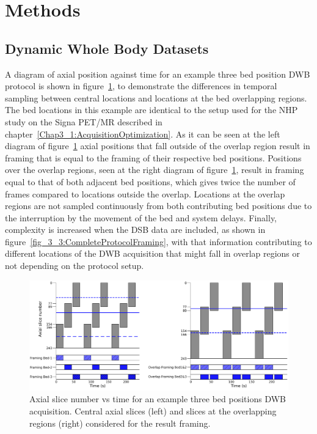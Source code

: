 \section{Methods}
\subsection{Dynamic Whole Body Datasets}
A diagram of axial position against time for an example three bed position DWB protocol is shown in figure~\ref{fig_3_3:OverlapFraming}, to demonstrate the differences in temporal sampling between central locations and locations at the bed overlapping regions. The bed locations in this example are identical to the setup used for the NHP study on the Signa PET/MR described in chapter~\ref{Chap3_1:AcquisitionOptimization}.
As it can be seen at the left diagram of figure~\ref{fig_3_3:OverlapFraming} axial positions that fall outside of the overlap region result in framing that is equal to the framing of their respective bed positions. Positions over the overlap regions, seen at the right diagram of figure~\ref{fig_3_3:OverlapFraming}, result in framing equal to that of both adjacent bed positions, which gives twice the number of frames compared to locations outside the overlap. Locations at the overlap regions are not sampled continuously from both contributing bed positions due to the interruption by the movement of the bed and system delays.  
Finally, complexity is increased when the DSB data are included, as shown in figure~\ref{fig_3_3:CompleteProtocolFraming}, with that information contributing to different locations of the DWB acquisition that might fall in overlap regions or not depending on the protocol setup. 

\begin{figure} [ht!]
\centering
\includegraphics[scale=0.50,angle=0]{3_Results/3_3_DWB_Reconstruction/figures/OverlapTiming.pdf}
\caption{Axial slice number vs time for an example three bed positions DWB acquisition. Central axial slices (left) and slices at the overlapping regions (right) considered for the result framing.} 
\label{fig_3_3:OverlapFraming}
\end{figure} 

